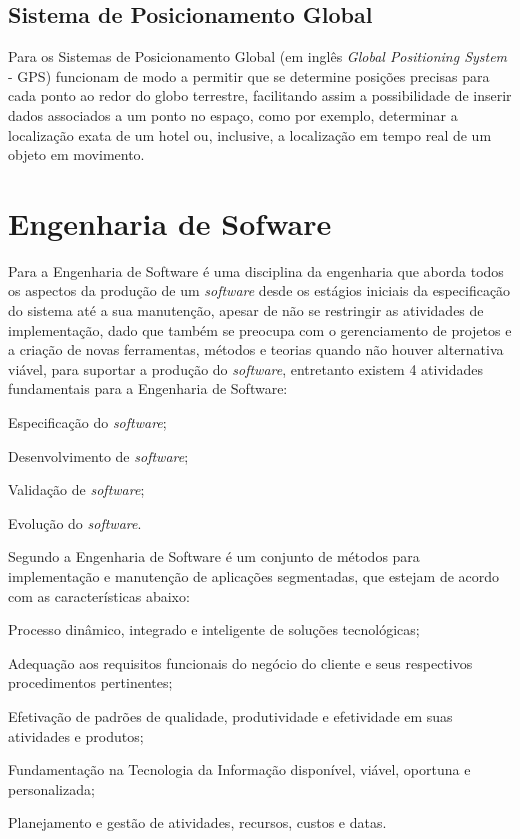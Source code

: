 \subsection{Sistema de Posicionamento Global}

Para  os Sistemas de Posicionamento Global (em inglês \textit{Global Positioning System} - GPS) funcionam de modo a permitir que se determine posições precisas para cada ponto ao redor do globo terrestre, facilitando assim a possibilidade de inserir dados associados a um ponto no espaço, como por exemplo, determinar a localização exata de um hotel ou, inclusive, a localização em tempo real de um objeto em movimento.

\section{Engenharia de Sofware}

Para  a Engenharia de Software é uma disciplina da engenharia que aborda todos os aspectos da produção de um \textit{software} desde os estágios iniciais da especificação do sistema até a sua manutenção, apesar de não se restringir as atividades de implementação, dado que também se preocupa com o gerenciamento de projetos e a criação de novas ferramentas, métodos e teorias quando não houver alternativa viável, para suportar a produção do \textit{software}, entretanto existem 4 atividades fundamentais para a Engenharia de Software:

\begin{lista}
\item Especificação do \textit{software};
\item Desenvolvimento de \textit{software};
\item Validação de \textit{software};
\item Evolução do \textit{software}.
\end{lista}

Segundo  a Engenharia de Software é um conjunto de métodos para implementação e manutenção de aplicações segmentadas, que estejam de acordo com as características abaixo:

\begin{lista}
\item Processo dinâmico, integrado e inteligente de soluções tecnológicas;
\item Adequação aos requisitos funcionais do negócio do cliente e seus respectivos procedimentos pertinentes;
\item Efetivação de padrões de qualidade, produtividade e efetividade em suas atividades e produtos;
\item Fundamentação na Tecnologia da Informação disponível, viável, oportuna e personalizada;
\item Planejamento e gestão de atividades, recursos, custos e datas.
\end{lista}

